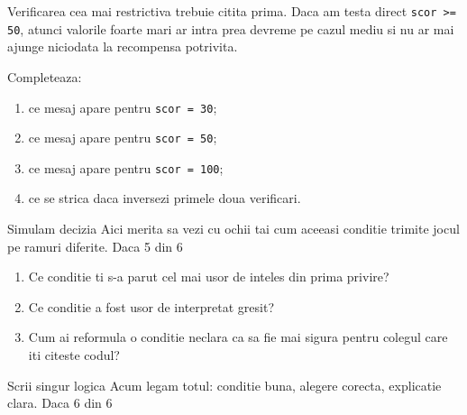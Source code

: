 \begin{missionbox}
Verificarea cea mai restrictiva trebuie citita prima. Daca am testa direct \texttt{scor >= 50}, atunci valorile foarte mari ar intra prea devreme pe cazul mediu si nu ar mai ajunge niciodata la recompensa potrivita.
\end{missionbox}

\begin{guidebox}
Completeaza:
\begin{enumerate}
\item ce mesaj apare pentru \texttt{scor = 30};
\item ce mesaj apare pentru \texttt{scor = 50};
\item ce mesaj apare pentru \texttt{scor = 100};
\item ce se strica daca inversezi primele doua verificari.
\end{enumerate}
\end{guidebox}

\clearpage

\PageHeader
  {Simulam decizia}
  {Aici merita sa vezi cu ochii tai cum aceeasi conditie trimite jocul pe ramuri diferite.}
  {Daca 5 din 6}


\begin{semibox}
\begin{enumerate}
\item Ce conditie ti s-a parut cel mai usor de inteles din prima privire?
\item Ce conditie a fost usor de interpretat gresit?
\item Cum ai reformula o conditie neclara ca sa fie mai sigura pentru colegul care iti citeste codul?
\end{enumerate}
\end{semibox}

\clearpage

\PageHeader
  {Scrii singur logica}
  {Acum legam totul: conditie buna, alegere corecta, explicatie clara.}
  {Daca 6 din 6}


